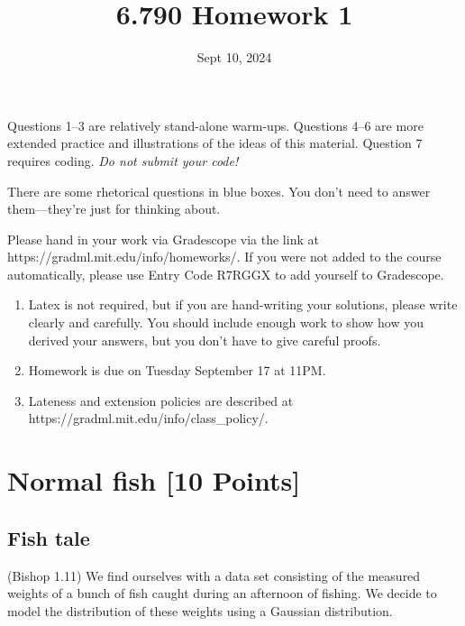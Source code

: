 \documentclass[11pt]{exam}
\date{Sept 10, 2024}
\title{6.790 Homework 1}
\newcommand{\note}[1]{\todo[color=blue!10,inline, linecolor=blue!90,size=\footnotesize]{\linespread{0.9}\selectfont{#1}\par}}
\begin{document}
\maketitle

Questions 1--3 are relatively stand-alone warm-ups.  Questions 4--6
are more extended practice and illustrations of the ideas of this
material.  Question 7 requires coding.  {\em Do not submit your code!}

There are some rhetorical questions in blue boxes. You don't need to
answer them---they're just for thinking about.

Please hand in your work via Gradescope via the link at https://gradml.mit.edu/info/homeworks/. If you were not added to the course automatically, please use Entry Code R7RGGX to add yourself to Gradescope.
\begin{enumerate}
 \item Latex is not required, but if you are hand-writing your solutions, please write clearly and carefully. You should include enough work to show how you derived your answers, but you don’t have to give careful proofs.
\item Homework is due on Tuesday September 17 at 11PM.
\item Lateness and extension policies are described at https://gradml.mit.edu/info/class\_policy/.
\end{enumerate}


\tableofcontents
\newpage




\section{Normal fish [10 Points]} 
\subsection{Fish tale}
 (Bishop 1.11)  We find ourselves with a data set consisting of the
 measured weights of a bunch of fish caught during an afternoon of
 fishing.  We decide to model the distribution of these weights using a
 Gaussian distribution.\note{Why might this not be a great modeling
   choice?} 
\end{document}

